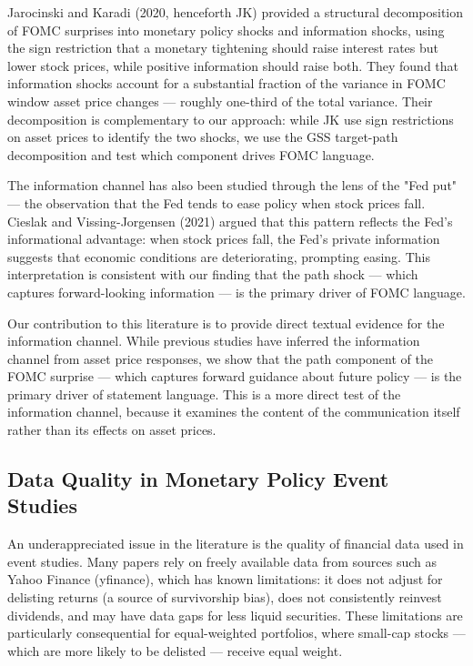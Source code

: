 Jarocinski and Karadi (2020, henceforth JK) provided a structural decomposition of FOMC surprises into monetary policy shocks and information shocks, using the sign restriction that a monetary tightening should raise interest rates but lower stock prices, while positive information should raise both. They found that information shocks account for a substantial fraction of the variance in FOMC window asset price changes --- roughly one-third of the total variance. Their decomposition is complementary to our approach: while JK use sign restrictions on asset prices to identify the two shocks, we use the GSS target-path decomposition and test which component drives FOMC language.

The information channel has also been studied through the lens of the "Fed put" --- the observation that the Fed tends to ease policy when stock prices fall. Cieslak and Vissing-Jorgensen (2021) argued that this pattern reflects the Fed's informational advantage: when stock prices fall, the Fed's private information suggests that economic conditions are deteriorating, prompting easing. This interpretation is consistent with our finding that the path shock --- which captures forward-looking information --- is the primary driver of FOMC language.

Our contribution to this literature is to provide direct textual evidence for the information channel. While previous studies have inferred the information channel from asset price responses, we show that the path component of the FOMC surprise --- which captures forward guidance about future policy --- is the primary driver of statement language. This is a more direct test of the information channel, because it examines the content of the communication itself rather than its effects on asset prices.

\subsection{Data Quality in Monetary Policy Event Studies}

An underappreciated issue in the literature is the quality of financial data used in event studies. Many papers rely on freely available data from sources such as Yahoo Finance (yfinance), which has known limitations: it does not adjust for delisting returns (a source of survivorship bias), does not consistently reinvest dividends, and may have data gaps for less liquid securities. These limitations are particularly consequential for equal-weighted portfolios, where small-cap stocks --- which are more likely to be delisted --- receive equal weight.

